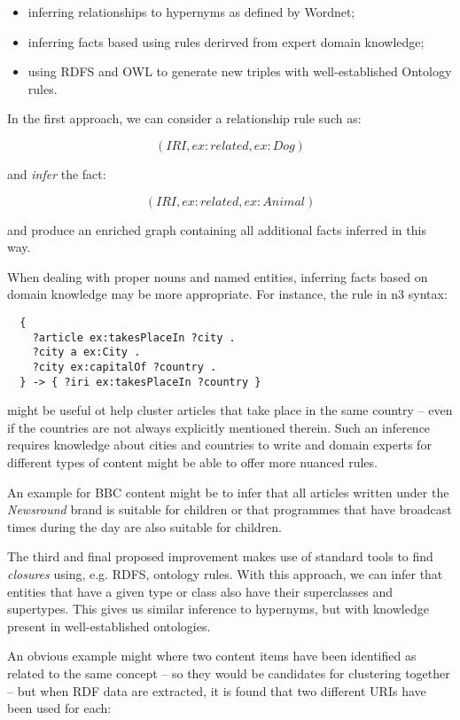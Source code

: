 \begin{itemize}
\item inferring relationships to hypernyms as defined by Wordnet\cite{miller1995wordnet};
\item inferring facts based using rules derirved from expert domain knowledge;
\item using RDFS and OWL to generate new triples with well-established Ontology rules.
\end{itemize}

In the first approach, we can consider a relationship rule such as:

$$
(IRI, ex:related, ex:Dog)
$$

\noindent and \emph{infer} the fact:

$$
(IRI, ex:related, ex:Animal)
$$

\noindent and produce an enriched graph containing all additional facts
inferred in this way.

When dealing with proper nouns and named entities, inferring facts based on
domain knowledge may be more appropriate. For instance, the rule in n3 syntax:

\begin{lstlisting}
  {
    ?article ex:takesPlaceIn ?city .
    ?city a ex:City .
    ?city ex:capitalOf ?country .
  } -> { ?iri ex:takesPlaceIn ?country }
\end{lstlisting}

\noindent might be useful ot help cluster articles that take place in the same
country -- even if the countries are not always explicitly mentioned therein.
Such an inference requires knowledge about cities and countries to
write and domain experts for different types of content might be able to offer
more nuanced rules.

An example for BBC content might be to infer that all articles written under
the \emph{Newsround} brand is suitable for children or that programmes that
have broadcast times during the day are also suitable for children.

The third and final proposed improvement makes use of standard tools to find
\emph{closures} using, e.g. RDFS, ontology rules. With this approach, we
can infer that entities that have a given type or class also have their
superclasses and supertypes. This gives us similar inference to hypernyms,
but with knowledge present in well-established ontologies.

An obvious example might where two content items have been identified as
related to the same concept -- so they would be candidates for clustering
together -- but when RDF data are extracted, it is found that two
different URIs have been used for each:

